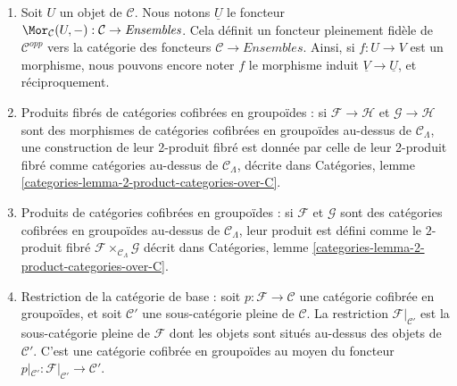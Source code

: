 \begin{remarks}
\begin{enumerate}
seuls morphismes sont les identités. La construction
(\ref{item-construction-associated-cofibered-groupoid}) associe alors à $F$ une
catégorie cofibrée en ensembles. On obtient ainsi un foncteur pleinement fidèle
de la catégorie des foncteurs $\mathcal{C} \to \textit{Ensembles}$ vers la catégorie
des catégories cofibrées en groupoïdes au-dessus de $\mathcal{C}$.
Nous identifions la catégorie des foncteurs à son image par ce foncteur.
Ainsi, si $F : \mathcal{C} \to \textit{Ensembles}$ est un foncteur, nous notons aussi
par $F$ la catégorie cofibrée en ensembles associée ; et si
$\varphi : F \to G$ est un morphisme de foncteurs, nous notons encore $\varphi$
le morphisme correspondant de catégories cofibrées en ensembles, et réciproquement.
Voir Catégories, section \ref{categories-section-fibred-in-sets}.
\item
\label{item-definition-yoneda}
Soit $U$ un objet de $\mathcal{C}$. Nous notons $\underline{U}$ le
foncteur
$\Mor_\mathcal{C}(U, -): \mathcal{C} \to
\textit{Ensembles}$. Cela définit un foncteur pleinement fidèle de $\mathcal
C^{opp}$ vers la catégorie des foncteurs $\mathcal{C} \to
\textit{Ensembles}$. Ainsi, si $f : U \to V$ est un morphisme, nous pouvons
encore noter $f$ le morphisme induit $\underline{V}
\to \underline{U}$, et réciproquement.
\item
\label{item-fibre-product}
Produits fibrés de catégories cofibrées en groupoïdes : si $\mathcal{F}
\to \mathcal{H}$ et $\mathcal{G} \to \mathcal{H}$ sont des morphismes
de catégories cofibrées en groupoïdes au-dessus de $\mathcal{C}_\Lambda$, une
construction de leur 2-produit fibré est donnée par celle de leur
2-produit fibré comme catégories au-dessus de $\mathcal{C}_\Lambda$, décrite dans
Catégories, lemme \ref{categories-lemma-2-product-categories-over-C}.
\item
\label{item-product}
Produits de catégories cofibrées en groupoïdes : si $\mathcal{F}$ et
$\mathcal{G}$ sont des catégories cofibrées en groupoïdes au-dessus de
$\mathcal{C}_\Lambda$, leur produit est défini comme le $2$-produit fibré
$\mathcal{F} \times_{\mathcal{C}_\Lambda} \mathcal{G}$ décrit dans
Catégories, lemme \ref{categories-lemma-2-product-categories-over-C}.
\item
\label{item-definition-restricting-base-category}
Restriction de la catégorie de base : soit $p : \mathcal{F} \to \mathcal{C}$
une catégorie cofibrée en groupoïdes, et soit $\mathcal{C}'$ une sous-catégorie
pleine de $\mathcal{C}$. La restriction $\mathcal{F}|_{\mathcal{C}'}$
est la sous-catégorie pleine de $\mathcal{F}$ dont les objets sont situés
au-dessus des objets de $\mathcal{C}'$. C'est une catégorie cofibrée en
groupoïdes au moyen du foncteur
$p|_{\mathcal{C}'}: \mathcal{F}|_{\mathcal{C}'} \to \mathcal{C}'$.
\end{enumerate}
\end{remarks}









